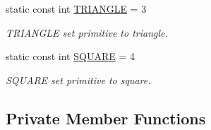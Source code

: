 \begin{DoxyCompactItemize}
static const int \hyperlink{class_canvas_a7d54031701bd0ddbe165a6d4350ab9d6}{T\+R\+I\+A\+N\+G\+LE} = 3
\begin{DoxyCompactList}\small\item\em T\+R\+I\+A\+N\+G\+LE set primitive to triangle. \end{DoxyCompactList}\item 
static const int \hyperlink{class_canvas_a2d0245c75d7fc30adb8abd303844c10f}{S\+Q\+U\+A\+RE} = 4
\begin{DoxyCompactList}\small\item\em S\+Q\+U\+A\+RE set primitive to square. \end{DoxyCompactList}\end{DoxyCompactItemize}
\subsection*{Private Member Functions}
